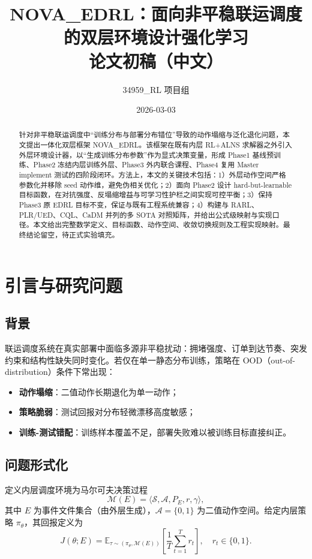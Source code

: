 \documentclass[UTF8,11pt,a4paper]{ctexart}
\title{NOVA\_EDRL：面向非平稳联运调度的双层环境设计强化学习\\论文初稿（中文）}
\author{34959\_RL 项目组}
\date{2026-03-03}
\begin{document}
\maketitle

\begin{abstract}
针对非平稳联运调度中“训练分布与部署分布错位”导致的动作塌缩与泛化退化问题，本文提出一体化双层框架 NOVA\_EDRL。该框架在既有内层 RL+ALNS 求解器之外引入外层环境设计器，以“生成训练分布参数”作为显式决策变量，形成 Phase1 基线预训练、Phase2 冻结内层训练外层、Phase3 外内联合课程、Phase4 复用 Master implement 测试的四阶段闭环。方法上，本文的关键技术包括：1）外层动作空间严格参数化并移除 seed 动作维，避免伪相关优化；2）面向 Phase2 设计 hard-but-learnable 目标函数，在对抗强度、反塌缩增益与可学习性护栏之间实现可控平衡；3）保持 Phase3 原 EDRL 目标不变，保证与既有工程系统兼容；4）构建与 RARL、PLR/UED、CQL、CaDM 并列的多 SOTA 对照矩阵，并给出公式级映射与实现口径。本文给出完整数学定义、目标函数、动作空间、收敛切换规则及工程实现映射。最终结论留空，待正式实验填充。
\end{abstract}

\tableofcontents
\newpage

\section{引言与研究问题}
\subsection{背景}
联运调度系统在真实部署中面临多源非平稳扰动：拥堵强度、订单到达节奏、突发约束和结构性缺失同时变化。若仅在单一静态分布训练，策略在 OOD（out-of-distribution）条件下常出现：
\begin{itemize}
\item \textbf{动作塌缩}：二值动作长期退化为单一动作；
\item \textbf{策略脆弱}：测试回报对分布轻微漂移高度敏感；
\item \textbf{训练-测试错配}：训练样本覆盖不足，部署失败难以被训练目标直接纠正。
\end{itemize}

\subsection{问题形式化}
定义内层调度环境为马尔可夫决策过程
\begin{equation}
\mathcal{M}(E)=\langle \mathcal{S},\mathcal{A},P_E,r,\gamma \rangle,
\end{equation}
其中 \(E\) 为事件文件集合（由外层生成），\(\mathcal{A}=\{0,1\}\) 为二值动作空间。给定内层策略 \(\pi_\theta\)，其回报定义为
\begin{equation}
J(\theta;E)=\mathbb{E}_{\tau\sim (\pi_\theta,\mathcal{M}(E))}\!\left[\frac{1}{T}\sum_{t=1}^{T} r_t\right],\quad r_t\in\{0,1\}.
\end{equation}
\end{document}
